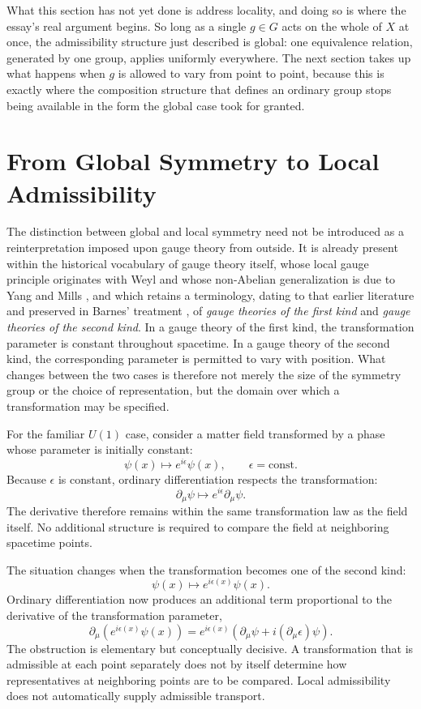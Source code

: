 \documentclass[11pt]{article}
\begin{document}
What this section has not yet done is address locality, and doing so is where the essay's real argument begins. So long as a single $g \in G$ acts on the whole of $X$ at once, the admissibility structure just described is global: one equivalence relation, generated by one group, applies uniformly everywhere. The next section takes up what happens when $g$ is allowed to vary from point to point, because this is exactly where the composition structure that defines an ordinary group stops being available in the form the global case took for granted.

\section{From Global Symmetry to Local Admissibility}

The distinction between global and local symmetry need not be introduced as a reinterpretation imposed upon gauge theory from outside. It is already present within the historical vocabulary of gauge theory itself, whose local gauge principle originates with Weyl \cite{Weyl1929} and whose non-Abelian generalization is due to Yang and Mills \cite{YangMills1954}, and which retains a terminology, dating to that earlier literature and preserved in Barnes' treatment \cite{Barnes2010}, of \emph{gauge theories of the first kind} and \emph{gauge theories of the second kind}. In a gauge theory of the first kind, the transformation parameter is constant throughout spacetime. In a gauge theory of the second kind, the corresponding parameter is permitted to vary with position. What changes between the two cases is therefore not merely the size of the symmetry group or the choice of representation, but the domain over which a transformation may be specified.

For the familiar $U(1)$ case, consider a matter field transformed by a phase whose parameter is initially constant:
\[
\psi(x) \longmapsto e^{i\epsilon}\psi(x), \qquad \epsilon = \mathrm{const}.
\]
Because $\epsilon$ is constant, ordinary differentiation respects the transformation:
\[
\partial_\mu \psi \longmapsto e^{i\epsilon}\partial_\mu \psi.
\]
The derivative therefore remains within the same transformation law as the field itself. No additional structure is required to compare the field at neighboring spacetime points.

The situation changes when the transformation becomes one of the second kind:
\[
\psi(x) \longmapsto e^{i\epsilon(x)}\psi(x).
\]
Ordinary differentiation now produces an additional term proportional to the derivative of the transformation parameter,
\[
\partial_\mu\left(e^{i\epsilon(x)}\psi(x)\right) = e^{i\epsilon(x)}\left(\partial_\mu\psi + i(\partial_\mu\epsilon)\psi\right).
\]
The obstruction is elementary but conceptually decisive. A transformation that is admissible at each point separately does not by itself determine how representatives at neighboring points are to be compared. Local admissibility does not automatically supply admissible transport.
\end{document}
